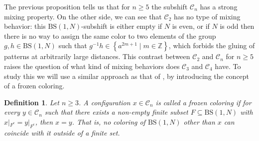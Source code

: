 \documentclass[cupthm,crop,info]{CUP-JNL-ETS}%
\theoremstyle{cupplain}
\theoremstyle{cupdefinition}
\newtheorem{definition}{Definition}[section]
\theoremstyle{cupremark}
\theoremstyle{cupproof}
\numberwithin{equation}{section}
\newcommand{\BS}[1][N]{\mathrm{BS}(1,#1)}
\begin{document}
The previous proposition tells us that for $n\ge 5$ the subshift $\mathcal{C}_n$ has a strong mixing property. On the other side, we can see that $\mathcal{C}_2$ has no type of mixing behavior: this $\BS$-subshift is either empty if $N$ is even, or if $N$ is odd then there is no way to assign the same color to two elements of the group $g,h\in \BS$ such that $g^{-1}h\in \left\{a^{2m+1}\mid m\in \mathbb{Z} \right\}$, which forbids the gluing of patterns at arbitrarily large distances. This contrast between $\mathcal{C}_2$ and $\mathcal{C}_n$ for $n\ge 5$ raises the question of what kind of mixing behaviors does $\mathcal{C}_3$ and $\mathcal{C}_4$ have. To study this we will use a similar approach as that of \cite{alon2019mixing}, by introducing the concept of a frozen coloring.
\begin{definition} Let $n\ge 3$. A configuration $x\in \mathcal{C}_n$ is called a \textit{frozen coloring} if for every $y\in \mathcal{C}_n$ such that there exists a non-empty finite subset $F\subseteq \BS$ with $x|_{F^c}=y|_{F^c}$, then $x= y$. That is, no coloring of $\BS$ other than $x$ can coincide with it outside of a finite set.
\end{definition}
\end{document}
